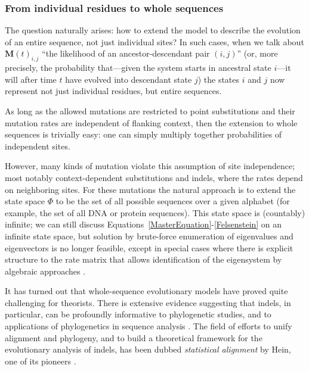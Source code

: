 \documentclass{bmcart}
\newcommand{\matr}[1]{\mathbf{#1}}
\newcommand{\statespace}{\Phi}
\newcommand{\condmatrix}{\matr{M}}
\begin{document}
\subsubsection*{From individual residues to whole sequences}

The question naturally arises: how to extend the model to describe the evolution of an entire sequence,
not just individual sites?
\color{red}
In such cases, when we talk about $\condmatrix(t)_{i,j}$ ``the likelihood of an ancestor-descendant pair $(i,j)$''
(or, more precisely, the probability that---given the system starts in ancestral state $i$---it will after time $t$ have evolved into descendant state $j$)
the states $i$ and $j$ now represent not just individual residues, but entire sequences.
\color{black}

As long as the allowed mutations are restricted to point substitutions
and their mutation rates are independent of flanking context,
then the extension to whole sequences is trivially easy:
one can simply multiply together probabilities of independent sites.

However, many kinds of mutation violate this assumption of site independence;
most notably context-dependent substitutions and indels, where the rates depend on neighboring sites.
For these mutations the natural approach is to extend the state space $\statespace$
to be the set of all possible sequences over a given alphabet
(for example, the set of all DNA or protein sequences).
This state space is (countably) infinite;
we can still discuss Equations~\ref{MasterEquation}-\ref{Felsenstein}
on an infinite state space,
but solution by brute-force enumeration of eigenvalues and eigenvectors is no longer feasible,
\color{red}
except in special cases where there is explicit structure to the rate matrix that allows identification of the eigensystem by algebraic approaches
\cite{LunterHein04,pmid21827770}.
\color{black}

It has turned out that whole-sequence evolutionary models have proved quite challenging for theorists.
There is extensive evidence suggesting that indels, in particular, can be profoundly informative to phylogenetic studies,
and to applications of phylogenetics in sequence analysis \cite{pmid8445636,pmid15276848,pmid18578882,pmid23475937,pmid19958081,pmid16354754}.
The field of efforts to unify alignment and phylogeny,
and to build a theoretical framework for the evolutionary analysis of indels,
has been dubbed
{\em statistical alignment} by Hein, one of its pioneers \cite{HeinEtal2000}.
\end{document}
